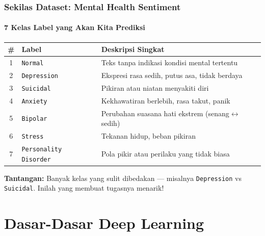 \documentclass[t,aspectratio=169,xcolor=dvipsnames]{beamer}
\renewcommand{\arraystretch}{1.35}
\begin{document}
\begin{frame}
    \frametitle{Sekilas Dataset: Mental Health Sentiment}
    \framesubtitle{7 Kelas Label yang Akan Kita Prediksi}
    \footnotesize
    {\renewcommand{\arraystretch}{1.15}
    \begin{center}
    \begin{tabular}{clp{5.8cm}}
        \toprule
        \textbf{\#} & \textbf{Label} & \textbf{Deskripsi Singkat} \\
        \midrule
        1 & \texttt{Normal}              & Teks tanpa indikasi kondisi mental tertentu \\
        2 & \texttt{Depression}          & Ekspresi rasa sedih, putus asa, tidak berdaya \\
        3 & \texttt{Suicidal}            & Pikiran atau niatan menyakiti diri \\
        4 & \texttt{Anxiety}             & Kekhawatiran berlebih, rasa takut, panik \\
        5 & \texttt{Bipolar}             & Perubahan suasana hati ekstrem (senang$\leftrightarrow$sedih) \\
        6 & \texttt{Stress}              & Tekanan hidup, beban pikiran \\
        7 & \texttt{Personality Disorder}& Pola pikir atau perilaku yang tidak biasa \\
        \bottomrule
    \end{tabular}
    \end{center}}
    \textcolor{nyuorange}{\textbf{Tantangan:}} Banyak kelas yang sulit dibedakan — misalnya \texttt{Depression} vs \texttt{Suicidal}. Inilah yang membuat tugasnya menarik!
\end{frame}

\section{Dasar-Dasar Deep Learning}
\end{document}

